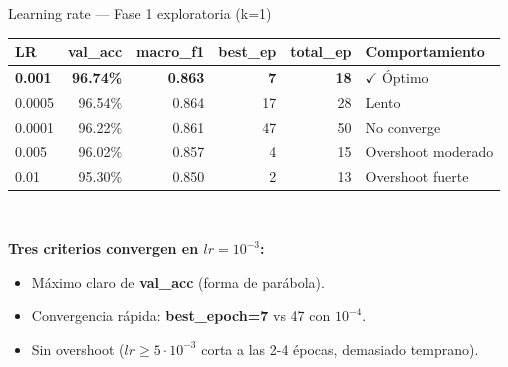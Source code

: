 \documentclass[11pt,aspectratio=169]{beamer}
\begin{document}
\begin{frame}{Learning rate — Fase 1 exploratoria (k=1)}
\centering\small
\begin{tabular}{@{}lrrrrl@{}}
\toprule
\textbf{LR} & \textbf{val\_acc} & \textbf{macro\_f1} & \textbf{best\_ep} & \textbf{total\_ep} & \textbf{Comportamiento} \\
\midrule
\rowcolor{accent2!15}
\textbf{0.001} & \textbf{96.74\%} & \textbf{0.863} & \textbf{7} & \textbf{18} & $\checkmark$ Óptimo \\
0.0005 & 96.54\% & 0.864 & 17 & 28 & Lento \\
0.0001 & 96.22\% & 0.861 & 47 & 50 & No converge \\
0.005  & 96.02\% & 0.857 & 4  & 15 & Overshoot moderado \\
0.01   & 95.30\% & 0.850 & 2  & 13 & Overshoot fuerte \\
\bottomrule
\end{tabular}\\[0.8em]

\raggedright\small
\textbf{Tres criterios convergen en $lr = 10^{-3}$:}
\begin{itemize}\setlength\itemsep{0.1em}
  \item Máximo claro de \textbf{val\_acc} (forma de parábola).
  \item Convergencia rápida: \textbf{best\_epoch=7} vs 47 con $10^{-4}$.
  \item Sin overshoot ($lr \geq 5\!\cdot\!10^{-3}$ corta a las 2-4 épocas, demasiado temprano).
\end{itemize}
\end{frame}
\end{document}
